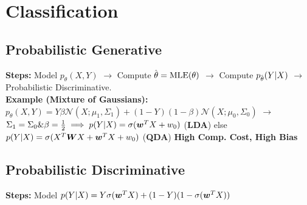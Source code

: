 \section*{Classification}


\subsection*{Probabilistic Generative}
\textbf{Steps:} Model $p_\theta(X,Y)$ $\rightarrow$ Compute $\hat{\kern0pt \theta} = \mathrm{MLE}(\theta)$ $\rightarrow$ Compute $p_{\hat{\kern0pt \theta}}(Y|X)$ $\rightarrow$ Probabilistic Discriminative.\\
\textbf{Example (Mixture of Gaussians):} $p_\theta(X,Y)=Y\beta\mathcal{N}(X;\mu_1,\Sigma_1)+(1-Y)(1-\beta)\mathcal{N}(X;\mu_0,\Sigma_0)$ $\rightarrow$ $\Sigma_1=\Sigma_0 \& \beta=\frac{1}{2} \implies p(Y|X) = \sigma({\bm{w}}^TX + w_0)$ (\textbf{LDA}) else $p(Y|X) = \sigma(X^T{\bm{W}} X + {\bm{w}}^TX + w_0)$ (\textbf{QDA})
\textbf{{\color{red} High Comp. Cost}, {\color{red}High Bias}}
\subsection*{Probabilistic Discriminative}
\textbf{Steps:} Model $p(Y|X) = Y\sigma({\bm{w}}^TX)+(1-Y)(1-\sigma({\bm{w}}^TX))$

